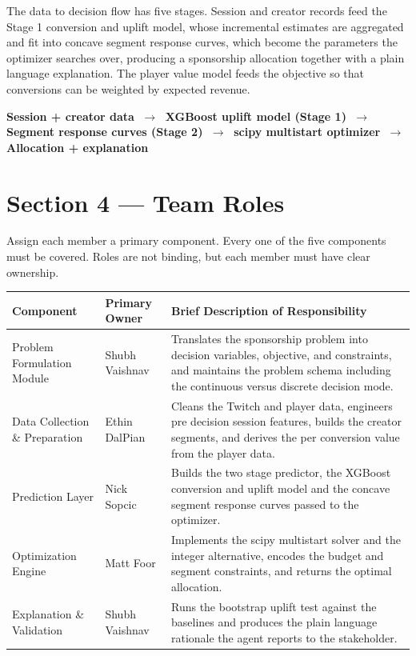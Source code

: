 \documentclass[11pt]{article}
\begin{document}
The data to decision flow has five stages. Session and creator records feed the Stage 1 conversion and uplift model, whose incremental estimates are aggregated and fit into concave segment response curves, which become the parameters the optimizer searches over, producing a sponsorship allocation together with a plain language explanation. The player value model feeds the objective so that conversions can be weighted by expected revenue.

\begin{center}
\small
\textbf{Session + creator data} $\;\longrightarrow\;$
\textbf{XGBoost uplift model (Stage 1)} $\;\longrightarrow\;$
\textbf{Segment response curves (Stage 2)} $\;\longrightarrow\;$
\textbf{scipy multistart optimizer} $\;\longrightarrow\;$
\textbf{Allocation + explanation}
\end{center}


\section{Section 4 — Team Roles}

\begin{hint}
  Assign each member a primary component. Every one of the five components must
  be covered. Roles are not binding, but each member must have clear ownership.
\end{hint}


\begin{center}
\begin{tabular}{llp{6.2cm}}
\toprule
\textbf{Component} & \textbf{Primary Owner} & \textbf{Brief Description of Responsibility} \\
\midrule
Problem Formulation Module     & Shubh Vaishnav & Translates the sponsorship problem into decision variables, objective, and constraints, and maintains the problem schema including the continuous versus discrete decision mode. \\
\addlinespace
Data Collection \& Preparation & Ethin DalPian & Cleans the Twitch and player data, engineers pre decision session features, builds the creator segments, and derives the per conversion value from the player data. \\
\addlinespace
Prediction Layer               & Nick Sopcic & Builds the two stage predictor, the XGBoost conversion and uplift model and the concave segment response curves passed to the optimizer. \\
\addlinespace
Optimization Engine            & Matt Foor & Implements the scipy multistart solver and the integer alternative, encodes the budget and segment constraints, and returns the optimal allocation. \\
\addlinespace
Explanation \& Validation      & Shubh Vaishnav & Runs the bootstrap uplift test against the baselines and produces the plain language rationale the agent reports to the stakeholder. \\
\bottomrule
\end{tabular}
\end{center}
\end{document}
